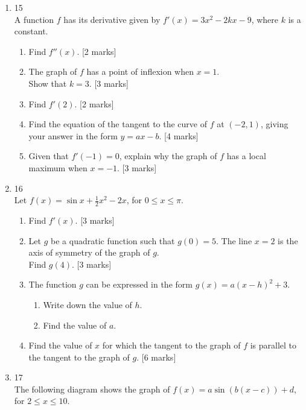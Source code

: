 \documentclass[12pt, twoside]{article}
\begin{document}
\begin{enumerate}
        \item 15\\
        A function $f$ has its derivative given by $f'(x)=3x^2-2kx-9$, where $k$ is a constant.
        \begin{enumerate}
          \item Find $f''(x)$. [2 marks]
          \item The graph of $f$ has a point of inflexion when $x=1$.\\
          Show that $k=3$. [3 marks]
          \item Find $f'(2)$. [2 marks]
          \item Find the equation of the tangent to the curve of $f$ at $(-2,1)$, giving your answer in the form  $y=ax-b$. [4 marks]
          \item Given that $f'(-1)=0$, explain why the graph of $f$ has a local maximum when $x=-1$. [3 marks]
        \end{enumerate}

        \item 16\\
        Let $f(x)=\sin x + \frac{1}{2} x^2 -2x$, for $0 \leq x \leq \pi$.\\
        \begin{enumerate}
          \item Find $f'(x)$. [3 marks]
          \item Let $g$ be a quadratic function such that $g(0)=5$. The line $x=2$ is the axis of symmetry of the graph of $g$.\\
          Find $g(4)$. [3 marks]
          \item The function $g$ can be expressed in the form $g(x)=a(x-h)^2+3$.
            \begin{enumerate}
              \item Write down the value of $h$.
              \item Find the value of $a$.
            \end{enumerate}
          \item Find the value of $x$ for which the tangent to the graph of $f$ is parallel to the tangent to the graph of $g$. [6 marks]
        \end{enumerate}

        \item 17\\
        The following diagram shows the graph of $f(x)=a \sin (b(x-c))+d$, for $2 \leq x \leq 10$.
          \begin{center}
\end{center}
\end{enumerate}
\end{document}
